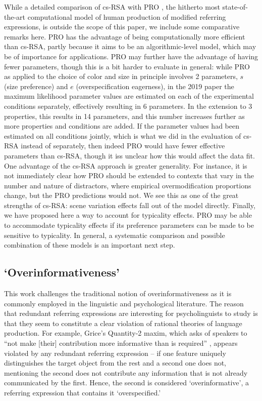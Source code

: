 \documentclass[11pt]{article}
\begin{document}
While a detailed comparison of cs-RSA with PRO \cite{VanGompel2019}, the hitherto most state-of-the-art computational model of human production of modified referring expressions, is outside the scope of this paper, we include some comparative remarks here. PRO has the advantage of being computationally more efficient than cs-RSA, partly because it aims to be an algorithmic-level model, which may be of importance for applications. PRO may further have the advantage of having fewer parameters, though this is a bit harder to evaluate in general: while PRO as applied to the choice of color and size in principle involves 2 parameters, $s$ (size preference) and $e$ (overspecification eagerness), in the 2019 paper the maximum likelihood parameter values are estimated on each of the experimental conditions separately, effectively resulting in 6 parameters. In the extension to 3 properties, this results in 14 parameters, and this number increases further as more properties and conditions are added. If the parameter values had been estimated on all conditions jointly, which is what we did in the evaluation of cs-RSA instead of separately, then indeed PRO would have fewer effective parameters than cs-RSA, though it iss unclear how this would affect the data fit. One advantage of the cs-RSA approach is greater generality. For instance, it is not immediately clear how PRO should be extended to contexts that vary in the number and nature of distractors, where empirical overmodification proportions  change, but the PRO predictions would not. We see this as one of the great strengths of cs-RSA: scene variation effects fall out of the model directly. Finally, we have proposed here a way to account for typicality effects. PRO may be able to accommodate typicality effects if its preference parameters can be made to be sensitive to typicality. In general, a systematic comparison and possible combination of these models is an important next step.

\subsection{`Overinformativeness'}

This work challenges the traditional notion of overinformativeness as it is commonly employed in the linguistic and psychological literature. The reason that redundant referring expressions are interesting for psycholinguists to study is that they seem to constitute a clear violation of rational theories of language production. For example, Grice's Quantity-2 maxim, which asks of speakers to ``not make [their] contribution more informative than is required'' \cite{grice1975}, appears violated by any redundant referring expression -- if one feature uniquely distinguishes the target object from the rest and a second one does not, mentioning the second does not contribute any information that is not already communicated by the first. Hence, the second is considered `overinformative', a referring expression that contains it  `overspecified.'
\end{document}
